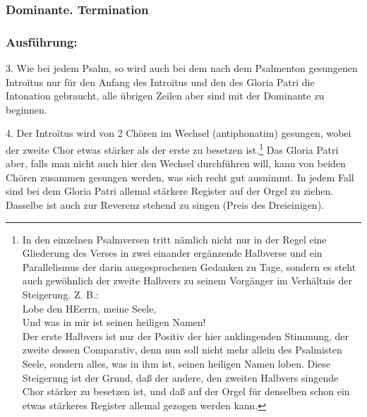 \subsubsection{Dominante. Termination}


\subsubsection{Ausführung:}


3. Wie bei jedem Psalm, so wird auch bei dem nach dem Psalmenton gesungenen Introïtus nur für den Anfang des Introïtus und den des Gloria Patri die Intonation gebraucht, alle übrigen Zeilen aber sind mit der Dominante zu beginnen.

4. Der Introïtus wird von 2 Chören im Wechsel (antiphonatim) gesungen, wobei der zweite Chor etwas stärker als der erste zu besetzen ist.\footnote{In den einzelnen Psalmversen tritt nämlich nicht nur in der Regel eine Gliederung des Verses in zwei einander ergänzende Halbverse und ein Parallelismus der darin ausgesprochenen Gedanken zu Tage, sondern es steht auch gewöhnlich der zweite Halbvers zu seinem Vorgänger im Verhältnis der Steigerung. Z. B.:\\
Lobe den HEerrn, meine Seele,\\
Und was in mir ist seinen heiligen Namen!\\
Der erste Halbvers ist nur der Positiv der hier anklingenden Stimmung, der zweite dessen Comparativ, denn nun soll nicht mehr allein des Psalmisten Seele, sondern alles, was in ihm ist, seinen heiligen Namen loben. Diese Steigerung ist der Grund, daß der andere, den zweiten Halbvers singende Chor stärker zu besetzen ist, und daß auf der Orgel für denselben schon ein etwas stärkeres Register allemal gezogen werden kann.} Das Gloria Patri aber, falls man nicht auch hier den Wechsel durchführen will, kann von beiden Chören zusammen gesungen werden, was sich recht gut ausnimmt. In jedem Fall sind bei dem Gloria Patri allemal stärkere Register auf der Orgel zu ziehen. Dasselbe ist auch zur Reverenz stehend zu singen (Preis des Dreieinigen).

